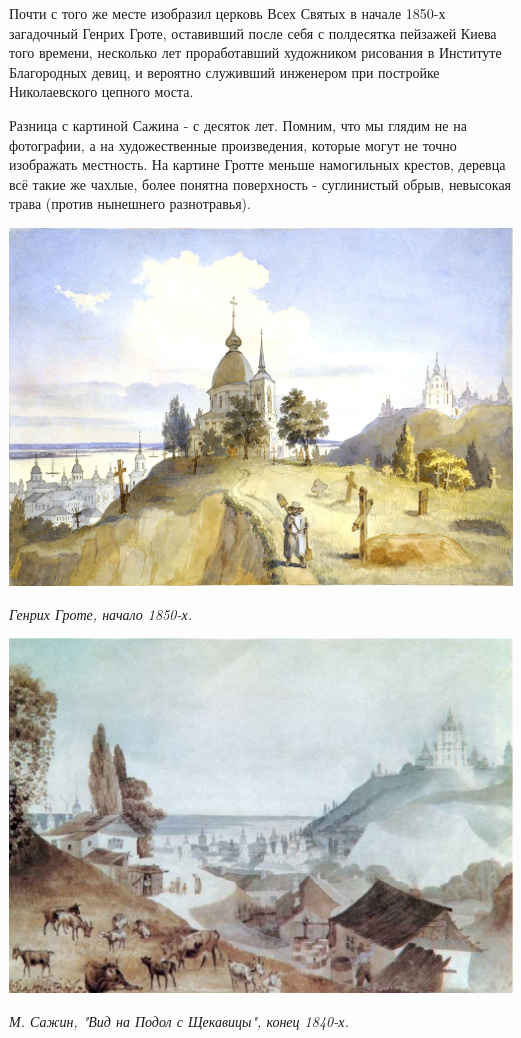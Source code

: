 Почти с того же месте изобразил церковь Всех Святых в начале 1850-х загадочный Генрих Гроте, оставивший после себя с полдесятка пейзажей Киева того времени, несколько лет проработавший художником рисования в Институте Благородных девиц, и вероятно служивший инженером при постройке Николаевского цепного моста.

Разница с картиной Сажина - с десяток лет. Помним, что мы глядим не на фотографии, а на художественные произведения, которые могут не точно изображать местность. На картине Гротте меньше намогильных крестов, деревца всё такие же чахлые, более понятна поверхность - суглинистый обрыв, невысокая трава (против нынешнего разнотравья).

\begin{center}
\includegraphics[width=\linewidth]{chast-colebanie-osnov/sheka/grote.jpg}

\textit{Генрих Гроте, начало 1850-х.}
\end{center}

\begin{center}
\includegraphics[width=\linewidth]{chast-colebanie-osnov/sheka/sajin-vid-s-shekavici.jpg}

\textit{М. Сажин, "Вид на Подол с Щекавицы", конец 1840-х.}
\end{center}





